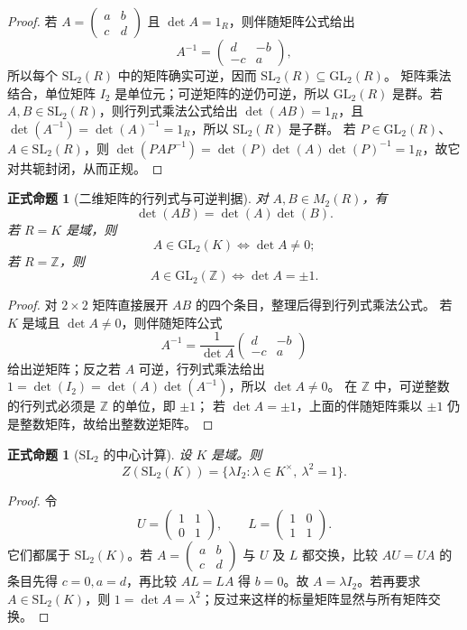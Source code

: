 \documentclass[UTF8,fontset=none,a4paper,11pt]{ctexart}
\theoremstyle{foundation-definition}
\theoremstyle{foundation-theorem}
\theoremstyle{foundation-proposition}
\newtheorem{proposition}[definition]{正式命题}
\theoremstyle{foundation-example}
\theoremstyle{foundation-remark}
\theoremstyle{foundation-theorem}
\begin{document}
\begin{proof}
若 \(A=\begin{pmatrix}a&b\\c&d\end{pmatrix}\) 且 \(\det A=1_R\)，则伴随矩阵公式给出
\[
A^{-1}=\begin{pmatrix}d&-b\\-c&a\end{pmatrix},
\]
所以每个 \(\mathrm{SL}_2(R)\) 中的矩阵确实可逆，因而
\(\mathrm{SL}_2(R)\subseteq\mathrm{GL}_2(R)\)。
矩阵乘法结合，单位矩阵 \(I_2\) 是单位元；可逆矩阵的逆仍可逆，所以 \(\mathrm{GL}_2(R)\) 是群。若 \(A,B\in\mathrm{SL}_2(R)\)，则行列式乘法公式给出
\(\det(AB)=1_R\)，且 \(\det(A^{-1})=\det(A)^{-1}=1_R\)，所以 \(\mathrm{SL}_2(R)\) 是子群。
若 \(P\in\mathrm{GL}_2(R)\)、\(A\in\mathrm{SL}_2(R)\)，则
\(\det(PAP^{-1})=\det(P)\det(A)\det(P)^{-1}=1_R\)，故它对共轭封闭，从而正规。
\end{proof}
\begin{proposition}[二维矩阵的行列式与可逆判据]\label{prop:matrix-invertibility}
对 \(A,B\in M_2(R)\)，有
\[
\det(AB)=\det(A)\det(B).
\]
若 \(R=K\) 是域，则
\[
A\in\mathrm{GL}_2(K)\Longleftrightarrow \det A\ne0;
\]
若 \(R=\mathbb Z\)，则
\[
A\in\mathrm{GL}_2(\mathbb Z)\Longleftrightarrow \det A=\pm1.
\]
\end{proposition}

\begin{proof}
对 \(2\times2\) 矩阵直接展开 \(AB\) 的四个条目，整理后得到行列式乘法公式。
若 \(K\) 是域且 \(\det A\ne0\)，则伴随矩阵公式
\[
A^{-1}=\frac1{\det A}
\begin{pmatrix}d&-b\\-c&a\end{pmatrix}
\]
给出逆矩阵；反之若 \(A\) 可逆，行列式乘法给出
\(1=\det(I_2)=\det(A)\det(A^{-1})\)，所以 \(\det A\ne0\)。
在 \(\mathbb Z\) 中，可逆整数的行列式必须是 \(\mathbb Z\) 的单位，即 \(\pm1\)；
若 \(\det A=\pm1\)，上面的伴随矩阵乘以 \(\pm1\) 仍是整数矩阵，故给出整数逆矩阵。
\end{proof}

\begin{proposition}[\(\mathrm{SL}_2\) 的中心计算]\label{prop:sl2-center}
设 \(K\) 是域。则
\[
Z(\mathrm{SL}_2(K))=\{\lambda I_2:\lambda\in K^\times,\ \lambda^2=1\}.
\]
\end{proposition}

\begin{proof}
令
\[
U=\begin{pmatrix}1&1\\0&1\end{pmatrix},
\qquad
L=\begin{pmatrix}1&0\\1&1\end{pmatrix}.
\]
它们都属于 \(\mathrm{SL}_2(K)\)。若
\(A=\begin{pmatrix}a&b\\c&d\end{pmatrix}\) 与 \(U\) 及 \(L\) 都交换，比较
\(AU=UA\) 的条目先得 \(c=0,a=d\)，再比较 \(AL=LA\) 得 \(b=0\)。故
\(A=\lambda I_2\)。若再要求 \(A\in\mathrm{SL}_2(K)\)，则
\(1=\det A=\lambda^2\)；反过来这样的标量矩阵显然与所有矩阵交换。
\end{proof}
\end{document}
